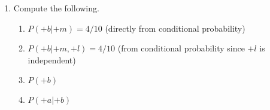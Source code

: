 \documentclass[12pt]{article}
\begin{document}
\begin{enumerate}
\begin{align*}
\intertext{The work for the first one is provided, while the others are left out. This is because the work is similar using Bayes' Nets.}
P(L,M,B,A) &= P(L|B,A,M)P(B|A,M)P(A|M)P(M)
\intertext{Where we can reduce this to the dependent variables, giving}
P(+l, +m, +b, +a) &= P(+l|+m)P(+b|+m)P(+a|+m)P(+m)
\intertext{Which is possible as the given conditional probabilities are only dependent upon $M$, and no the other conditions. Plugging in the values gives}
P(+l, +m, +b, +a) &= \left( \frac{8}{35} \right) \cdot \left( \frac{4}{10} \right) \cdot \left( \frac{3}{4} \right) \cdot \left( \frac{7}{24} \right) = \frac{1}{50}
\end{align*}

\item Compute the following.

      \begin{enumerate}

      \item $P(+b | +m) = 4/10$ (directly from conditional probability)

      \item $P(+b | +m, +l) = 4/10$ (from conditional probability since $+l$ is independent)

      \item $P(+b)$

      \item $P(+a | +b)$

      \end{enumerate}

\end{enumerate}
\end{document}
